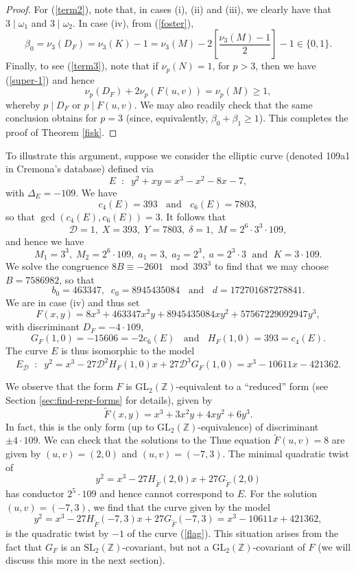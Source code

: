 \documentclass[11pt]{report}
\theoremstyle{definition}
\begin{document}
\begin{proof}
For (\ref{term2}), note that, in cases (i), (ii) and (iii), we clearly have that  $3 \mid \omega_1$ and $3 \mid \omega_2$.  In case (iv), from (\ref{foster}),
$$
\beta_0 = \nu_3 (D_F) = \nu_3(K) -1 = \nu_3(M) - 2  \left[ \frac{\nu_3(M)-1}{2} \right] - 1 \in \{ 0, 1 \}.
$$
Finally, to see (\ref{term3}), note that if $\nu_p(N)=1$, for  $p > 3$, then we have (\ref{super-1}) and hence
$$
\nu_p(D_F) + 2 \nu_p (F(u,v)) = \nu_p(M) \geq 1,
$$
whereby $p \mid D_F$ or $p \mid F(u,v)$.
We may also readily check that the same conclusion obtains for $p=3$ (since, equivalently, $\beta_0+\beta_1 \geq 1$). This completes the proof of Theorem \ref{fisk}.


\end{proof}

To illustrate this argument, suppose we consider the elliptic curve (denoted 109a1 in Cremona's database) defined via
$$
E \; \; : \; \; y^2 + xy = x^3 - x^2 -8 x -7,
$$
with $\Delta_E=-109$.
We have
$$
c_4(E) = 393 \; \; \mbox{ and } \; \; c_6(E)=7803,
$$
so that $\gcd (c_4(E), c_6(E))=3$. It follows that
$$
\mathcal{D} = 1, \; X=393, \; Y=7803, \; \delta=1, \; M = 2^6 \cdot 3^3 \cdot 109,
$$
and hence we have
$$
M_1 = 3^3, \; M_2=2^6 \cdot 109, \; a_1 = 3, \; a_2 = 2^3, \; a=2^3 \cdot 3 \; \mbox{ and } \; K = 3 \cdot 109.
$$
We solve the congruence $8B \equiv -2601 \mod{393^3}$ to find that we may choose $B=7586982$, so that
$$
b_0 =463347, \; \;
c_0 = 8945435084 \; \; \mbox{ and } \; \;
d =172701687278841.
$$
We are in case (iv) and thus set
$$
F(x,y) = 8 x^3 + 463347 x^2 y + 8945435084 x y^2 + 57567229092947 y^3,
$$
with discriminant $D_F = -4 \cdot 109$,
$$
G_F(1,0) = -15606 = -2 c_6(E) \; \; \mbox{ and } \; \; H_F(1,0)=393 = c_4(E).
$$
The curve $E$ is thus isomorphic to the model
\begin{equation} \label{flag}
E_{\mathcal{D}} \; \; : \; \; y^2 = x^3 - 27 \mathcal{D}^2 H_{F}(1,0) x + 27 \mathcal{D}^3 G_{F}(1,0) = x^3 - 10611x-421362.
\end{equation}

We observe that the form $F$ is $\mbox{GL}_2(\mathbb{Z})$-equivalent to a ``reduced'' form (see Section \ref{sec:find-repr-forms} for details),  given by
$$
\tilde{F} (x,y) = x^3 + 3 x^2y + 4 x y^2 + 6 y^3.
$$
In fact, this is the only form (up to $\mbox{GL}_2(\mathbb{Z})$-equivalence) of discriminant $\pm 4 \cdot 109$. We can check that the solutions to the Thue equation
$\tilde{F}(u,v)=8$ are given by $(u,v)=(2,0)$ and $(u,v)=(-7,3)$.
The minimal quadratic twist of
$$
y^2 = x^3 -27 H_{\tilde{F}}(2,0) x +27 G_{\tilde{F}}(2,0)
$$
has conductor $2^5 \cdot 109$ and hence cannot correspond to $E$. For the solution $(u,v)=(-7,3)$, we find that the curve given by the model
$$
y^2 = x^3 -27 H_{\tilde{F}}(-7,3) x +27 G_{\tilde{F}}(-7,3) =x^3 - 10611x+421362,
$$
is the quadratic twist by $-1$ of the curve (\ref{flag}). This situation arises from the fact that $G_F$ is an $\mbox{SL}_2(\mathbb{Z})$-covariant, but not a $\mbox{GL}_2(\mathbb{Z})$-covariant of $F$ (we will discuss this more in the next section).
\end{document}
